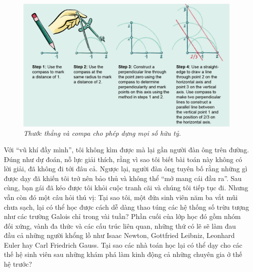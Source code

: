 \begin{multicols}{2}
	\begin{figure}[H]
		\centering
		\vspace*{-5pt}
		\captionsetup{labelformat= empty, justification=centering}
		\includegraphics[width=1\linewidth]{1}
		\caption{\small\textit{\color{duongvaotoanhoc}Thước thẳng và compa cho phép dựng mọi số hữu tỷ.}}
		\vspace*{-10pt}
	\end{figure}
	Với ``vũ khí đầy mình'', tôi không kìm được mà lại gần người đàn ông trên đường. Đúng như dự đoán, nỗ lực giải thích, rằng vì sao tôi biết bài toán này không có lời giải, đã không đi tới đâu cả. Ngược lại, người đàn ông tuyên bố rằng những gì được dạy đã khiến tôi trở nên bảo thủ và không thể ``mở mang cái đầu ra''. Sau cùng, bạn gái đã kéo được tôi khỏi cuộc tranh cãi và chúng tôi tiếp tục đi.
	\vskip 0.1cm
	Nhưng vẫn còn đó một câu hỏi thú vị: Tại sao tôi, một đứa sinh viên năm ba vắt mũi chưa sạch, lại có thể học được cách dễ dàng thao túng các hệ thống số trừu tượng như các trường Galois chỉ trong vài tuần? Phần cuối của lớp học đó gồm nhóm đối xứng, vành đa thức và các cấu trúc liên quan, những thứ có lẽ sẽ làm đau đầu cả những người khổng lồ như Isaac Newton, Gottfried Leibniz, Leonhard Euler hay Carl Friedrich Gauss. Tại sao các nhà toán học lại có thể dạy cho các thế hệ sinh viên sau những khám phá làm kinh động cả những chuyên gia ở thế hệ trước?
	\begin{figure}[H]
		\centering
		\vspace*{-5pt}
		\captionsetup{labelformat= empty, justification=centering}

\end{figure}
\end{multicols}
